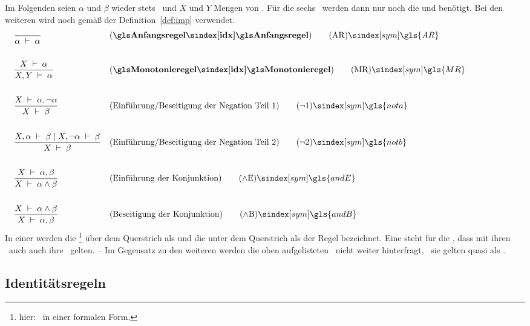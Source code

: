 {Im Folgenden seien $\alpha$ und $\beta$ wieder stets \Formeln\ und $X$ und $Y$ Mengen von \Formeln.
Für die sechs \Basisregeln\ werden dann nur noch die \Junktoren \chrqt{$\lnot$} und \chrqt{$\land$} benötigt.
Bei den weiteren  wird noch \chrqt{$\limp$} gemäß der Definition~\vref{def:imp} verwendet.
%
\begin{align}
	& \frac{}{\alpha\derive\alpha}
	& & (\text{\defn{\Anfangsregel}})
	\tag{\tagAR} \sym{\gls{AR}} \label{def:Anfangsregel}
	\\\\
	& \frac{X\derive\alpha}{X,Y\derive\alpha}
	& & (\text{\defn{\glsIdx{Monotonieregel}}})
	\tag{\tagMR} \sym{\gls{MR}} \label{def:Monotonieregel}
	\\\\
	& \frac{X\derive\alpha,\lnot\alpha}{X\derive\beta}
	& & (\text{Einführung/Beseitigung der Negation Teil 1})
	\tag{\tagnota} \sym{\gls{nota}} \label{def:nota}
	\\\\
	& \frac{X,\alpha\derive\beta \srand X,\lnot\alpha\derive\beta}{X\derive\beta}
	& & (\text{Einführung/Beseitigung der Negation Teil 2})
	\tag{\tagnotb} \sym{\gls{notb}} \label{def:notb}
	\\\\
	& \frac{X\derive\alpha,\beta}{X\derive\alpha\land\beta}
	& & (\text{Einführung der Konjunktion})
	\tag{\tagandE} \sym{\gls{andE}} \label{def:andE}
	\\\\
	& \frac{X\derive\alpha\land\beta}{X\derive\alpha,\beta}
	& & (\text{Beseitigung der Konjunktion})
	\tag{\tagandB} \sym{\gls{andB}} \label{def:andB}
	\formulatoleft
\end{align}
%
In einer  werden die \Formeln%
\footnote{hier: \Aussagen\ in einer formalen Form.}
über dem Querstrich als  und die unter dem Querstrich als  der Regel bezeichnet.
Eine  steht für die \Aussage, dass mit ihren \Voraussetzungen\ auch auch ihre \Folgerungen\ gelten.
-- Im Gegensatz zu den weiteren  werden die oben aufgelisteten \Basisregeln\ nicht weiter hinterfragt, \textdh\ sie gelten quasi als \Axiome.

\subsection{Identitätsregeln}%
\label{sub:Identitätsregeln}

}
